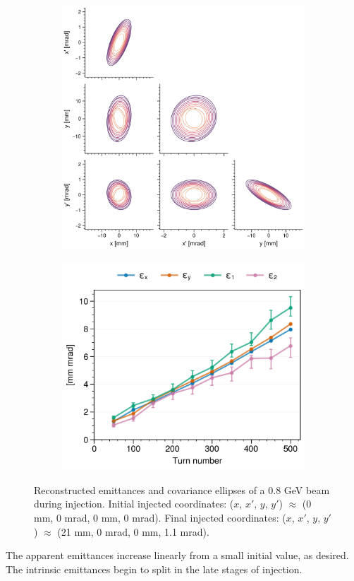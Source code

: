 %
%
\begin{figure}[!p]
    \centering
    \begin{subfigure}{0.6\textwidth}
        \includegraphics[width=\textwidth]{Images/chapter5/exp2/corner.png}
    \end{subfigure}
    \hfill
    \begin{subfigure}[t]{0.39\textwidth}
        \includegraphics[width=\textwidth]{Images/chapter5/exp2/emittances.png}
    \end{subfigure}
    \caption{Reconstructed emittances and covariance ellipses of a 0.8 GeV beam during injection. Initial injected coordinates: ($x$, $x'$, $y$, $y'$) $\approx$ (0 mm, 0 mrad, 0 mm, 0 mrad). Final injected coordinates: ($x$, $x'$, $y$, $y'$) $\approx$ (21 mm, 0 mrad, 0 mm, 1.1 mrad).}
    \label{fig:exp2_emittances}
\end{figure}
%
The apparent emittances increase linearly from a small initial value, as desired. The intrinsic emittances begin to split in the late stages of injection. 

